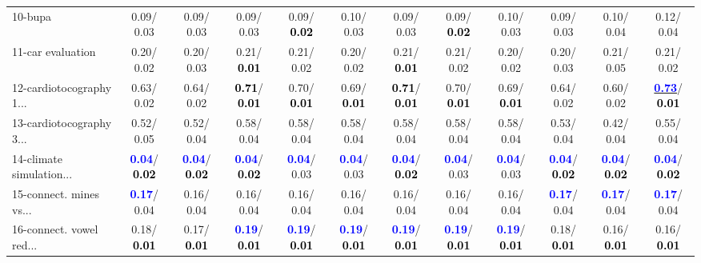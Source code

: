\begin{table}[h]
\begin{center}
{\begin{tabular}{lc|c|c|c|c|c|c|c|c|c|c}
10-bupa &   0.09/  0.03 &   0.09/  0.03 &   0.09/  0.03 &   0.09/\textcolor{black}{\textbf{  0.02}} &   0.10/  0.03 &   0.09/  0.03 &   0.09/\textcolor{black}{\textbf{  0.02}} &   0.10/  0.03 &   0.09/  0.03 &   0.10/  0.04 &   0.12/  0.04 \\
11-car evaluation &   0.20/  0.02 &   0.20/  0.03 &   0.21/\textcolor{black}{\textbf{  0.01}} &   0.21/  0.02 &   0.20/  0.02 &   0.21/\textcolor{black}{\textbf{  0.01}} &   0.21/  0.02 &   0.20/  0.02 &   0.20/  0.03 &   0.21/  0.05 &   0.21/  0.02 \\
12-cardiotocography 1... &   0.63/  0.02 &   0.64/  0.02 & \textcolor{black}{\textbf{  0.71}}/\textcolor{black}{\textbf{  0.01}} &   0.70/\textcolor{black}{\textbf{  0.01}} &   0.69/\textcolor{black}{\textbf{  0.01}} & \textcolor{black}{\textbf{  0.71}}/\textcolor{black}{\textbf{  0.01}} &   0.70/\textcolor{black}{\textbf{  0.01}} &   0.69/\textcolor{black}{\textbf{  0.01}} &   0.64/  0.02 &   0.60/  0.02 & \underline{\textcolor{blue}{\textbf{  0.73}}}/\textcolor{black}{\textbf{  0.01}} \\
13-cardiotocography 3... &   0.52/  0.05 &   0.52/  0.04 &   0.58/  0.04 &   0.58/  0.04 &   0.58/  0.04 &   0.58/  0.04 &   0.58/  0.04 &   0.58/  0.04 &   0.53/  0.04 &   0.42/  0.04 &   0.55/  0.04 \\
14-climate simulation... & \textcolor{blue}{\textbf{  0.04}}/\textcolor{black}{\textbf{  0.02}} & \textcolor{blue}{\textbf{  0.04}}/\textcolor{black}{\textbf{  0.02}} & \textcolor{blue}{\textbf{  0.04}}/\textcolor{black}{\textbf{  0.02}} & \textcolor{blue}{\textbf{  0.04}}/  0.03 & \textcolor{blue}{\textbf{  0.04}}/  0.03 & \textcolor{blue}{\textbf{  0.04}}/\textcolor{black}{\textbf{  0.02}} & \textcolor{blue}{\textbf{  0.04}}/  0.03 & \textcolor{blue}{\textbf{  0.04}}/  0.03 & \textcolor{blue}{\textbf{  0.04}}/\textcolor{black}{\textbf{  0.02}} & \textcolor{blue}{\textbf{  0.04}}/\textcolor{black}{\textbf{  0.02}} & \textcolor{blue}{\textbf{  0.04}}/\textcolor{black}{\textbf{  0.02}} \\ \hline
15-connect. mines vs... & \textcolor{blue}{\textbf{  0.17}}/  0.04 &   0.16/  0.04 &   0.16/  0.04 &   0.16/  0.04 &   0.16/  0.04 &   0.16/  0.04 &   0.16/  0.04 &   0.16/  0.04 & \textcolor{blue}{\textbf{  0.17}}/  0.04 & \textcolor{blue}{\textbf{  0.17}}/  0.04 & \textcolor{blue}{\textbf{  0.17}}/  0.04 \\
16-connect. vowel red... &   0.18/\textcolor{black}{\textbf{  0.01}} &   0.17/\textcolor{black}{\textbf{  0.01}} & \textcolor{blue}{\textbf{  0.19}}/\textcolor{black}{\textbf{  0.01}} & \textcolor{blue}{\textbf{  0.19}}/\textcolor{black}{\textbf{  0.01}} & \textcolor{blue}{\textbf{  0.19}}/\textcolor{black}{\textbf{  0.01}} & \textcolor{blue}{\textbf{  0.19}}/\textcolor{black}{\textbf{  0.01}} & \textcolor{blue}{\textbf{  0.19}}/\textcolor{black}{\textbf{  0.01}} & \textcolor{blue}{\textbf{  0.19}}/\textcolor{black}{\textbf{  0.01}} &   0.18/\textcolor{black}{\textbf{  0.01}} &   0.16/\textcolor{black}{\textbf{  0.01}} &   0.16/\textcolor{black}{\textbf{  0.01}} \\

\end{tabular}}
\end{center}
\end{table}
